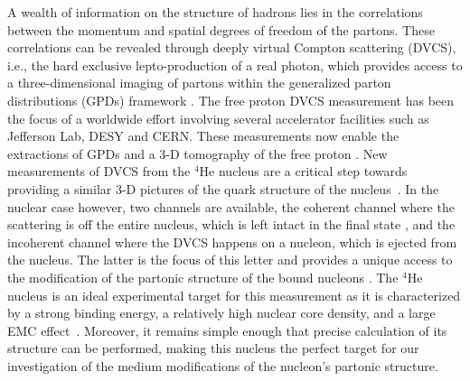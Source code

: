 \documentclass[twocolumn,nofootinbib,showpacs,prl,superscriptaddress,secnumarabic,amssymb,nobibnotes,aps,floatfix]{revtex4}
\begin{document}
A wealth of information on the structure of hadrons lies in the correlations 
between the momentum and spatial degrees of freedom of the partons. These 
correlations can be revealed through deeply virtual Compton scattering (DVCS), 
i.e., the hard exclusive lepto-production of a real photon, which provides 
access to a three-dimensional imaging of partons within the generalized parton 
distributions (GPDs) framework 
\cite{Mueller:1998fv,Ji:1996ek,Ji:1996nm,Radyushkin:1996nd,Radyushkin:1997ki}.   
The free proton DVCS measurement has been the focus of a worldwide effort 
\cite{Stepanyan:2001sm,Airapetian:2001yk,Airapetian:2006zr,Chekanov:2003ya,Aktas:2005ty,Chen:2006na,Munoz 
Camacho:2006hx,Girod:2007aa,Mazouz:2007aa,Gavalian:2009,Seder:2015,Pisano:2015,Jo:2015ema}
involving several accelerator facilities such as Jefferson Lab, DESY and  
CERN. These measurements now enable the extractions of GPDs 
and a 3-D tomography of the free proton \cite{Guidal:2013rya,Dupre:2016mai}.  
New measurements of DVCS from the $^{4}$He nucleus are a critical 
step towards providing a similar 3-D pictures of the quark structure of the 
nucleus~\cite{Dupre:2015jha}. In the nuclear case however, two channels are available,
the coherent channel where the scattering is off the entire nucleus, which is 
left intact in the final state \cite{Airapetian:2009cga,
Hattawy:2017woc}, and the incoherent channel where the DVCS happens on a 
nucleon, which is ejected from the nucleus.
The latter is the focus of this letter and provides a unique access to the 
modification of the partonic structure of the bound nucleons 
\cite{simonetta_2,Guzey:2006xi,Guzey:2008fe}. The 
$^{4}$He nucleus is an ideal experimental target for this measurement as it is 
characterized by a strong binding energy, a relatively high nuclear 
core density, and a large EMC effect~\cite{JSeely}. Moreover, it remains simple 
enough that precise calculation of its structure 
can be performed, making this nucleus the perfect target for our investigation of the 
medium modifications of the nucleon's partonic structure. 
\end{document}
